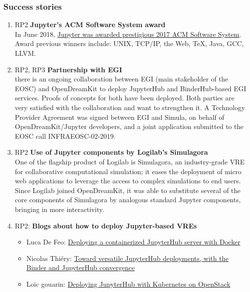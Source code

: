 \subsubsection{Success stories}
\begin{enumerate}
\item RP2 \textbf{Jupyter's ACM Software System award}\\
  In June 2018,
  \href{https://blog.jupyter.org/jupyter-receives-the-acm-software-system-award-d433b0dfe3a2}{Jupyter
    was awarded prestigious 2017 ACM Software System}. Award previous
  winners include: UNIX, TCP/IP, the Web, TeX, Java, GCC, LLVM.

\item RP2, RP3 \textbf{Partnership with EGI}\\
  there is an ongoing collaboration between EGI (main stakeholder of
  the EOSC) and OpenDreamKit to deploy JupyterHub and BinderHub-based
  EGI services. Proofs of concepts for both have been
  deployed. %
  Both parties are very satisfied with the collaboration and want to
  strengthen it. A Technology Provider Agreement was signed between
  EGI and Simula, on behalf of OpenDreamKit/Jupyter developers, and a
  joint application submitted to the EOSC call INFRAEOSC-02-2019.

\item RP2 \textbf{Use of Jupyter components by Logilab's Simulagora}\\
  One of the flagship product of Logilab is Simulagora, an
  industry-grade VRE for collaborative computational simulation; it
  eases the deployment of micro web applications to leverage the
  access to complex simulations to end users. Since Logilab joined
  OpenDreamKit, it was able to substitute several of the core
  components of Simulagora by analogous standard Jupyter
  components, bringing in more interactivity.

\item RP2: \textbf{Blogs about how to deploy Jupyter-based VREs}
  \begin{itemize}
  \item Luca De Feo: \href{https://opendreamkit.org/2018/10/17/jupyterhub-docker/}{Deploying a containerized JupyterHub server with Docker}
  \item Nicolas Thiéry: \href{https://opendreamkit.org/2018/03/15/jupyterhub-binder-convergence/}{Toward versatile JupyterHub deployments, with the Binder and JupyterHub convergence}
  \item Loic gouarin: \href{https://blog.jupyter.org/how-to-deploy-jupyterhub-with-kubernetes-on-openstack-f8f6120d4b1}{Deploying JupyterHub with Kubernetes on OpenStack}
  \end{itemize}


\end{enumerate}
